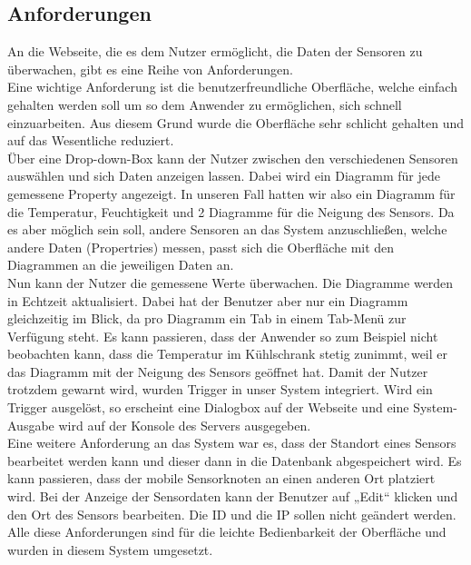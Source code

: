 \documentclass[12pt,a4paper,twoside]{article}
\begin{document}
\subsection{Anforderungen}

An die Webseite, die es dem Nutzer ermöglicht, die Daten der Sensoren zu überwachen, gibt es eine Reihe von Anforderungen. \\
Eine wichtige Anforderung ist die benutzerfreundliche Oberfläche, welche einfach gehalten werden soll um so dem Anwender zu ermöglichen, sich schnell einzuarbeiten. Aus diesem Grund wurde die Oberfläche sehr schlicht gehalten und auf das Wesentliche reduziert.\\
Über eine Drop-down-Box kann der Nutzer zwischen den verschiedenen Sensoren auswählen und sich Daten anzeigen lassen. Dabei wird ein Diagramm für jede gemessene Property angezeigt. In unseren Fall hatten wir also ein Diagramm für die Temperatur, Feuchtigkeit und 2 Diagramme für die Neigung des Sensors. Da es aber möglich sein soll, andere Sensoren an das System anzuschließen, welche andere Daten (Propertries) messen, passt sich die Oberfläche mit den Diagrammen an die jeweiligen Daten an.\\
Nun kann der Nutzer die gemessene Werte überwachen. Die Diagramme werden in Echtzeit aktualisiert. Dabei hat der Benutzer aber nur ein Diagramm gleichzeitig im Blick, da pro Diagramm ein Tab in einem Tab-Menü zur Verfügung steht. Es kann passieren, dass der Anwender so zum Beispiel nicht beobachten kann, dass die Temperatur im Kühlschrank stetig zunimmt, weil er das Diagramm mit der Neigung des Sensors geöffnet hat. Damit der Nutzer trotzdem gewarnt wird, wurden Trigger in unser System integriert. Wird ein Trigger ausgelöst, so erscheint eine Dialogbox auf der Webseite und eine System-Ausgabe wird auf der Konsole des Servers ausgegeben.\\
Eine weitere Anforderung an das System war es, dass der Standort eines Sensors bearbeitet werden kann und dieser dann in die Datenbank abgespeichert wird. Es kann passieren, dass der mobile Sensorknoten an einen anderen Ort platziert wird. Bei der Anzeige der Sensordaten kann der Benutzer auf „Edit“ klicken und den Ort des Sensors bearbeiten. Die ID und die IP sollen nicht geändert werden. \\
Alle diese Anforderungen sind für die leichte Bedienbarkeit der Oberfläche und wurden in diesem System umgesetzt.
\end{document}
